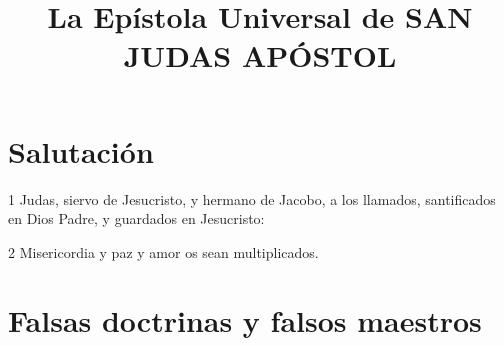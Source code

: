 
\title{La Epístola Universal de SAN JUDAS APÓSTOL}

\section*{Salutación}

\par 1 Judas, siervo de Jesucristo, y hermano de Jacobo, a los llamados, santificados en Dios Padre, y guardados en Jesucristo:
\par 2 Misericordia y paz y amor os sean multiplicados.

\section*{Falsas doctrinas y falsos maestros}

